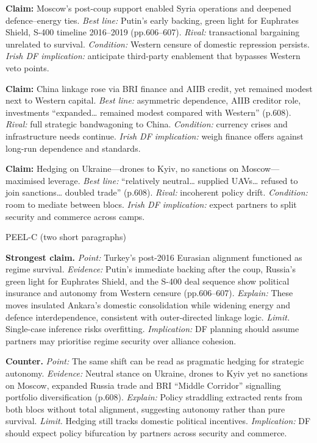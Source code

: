\textbf{Claim:} Moscow’s post-coup support enabled Syria operations and deepened defence–energy ties. \textit{Best line:} Putin’s early backing, green light for Euphrates Shield, S-400 timeline 2016–2019 (pp.606–607). \textit{Rival:} transactional bargaining unrelated to survival. \textit{Condition:} Western censure of domestic repression persists. \textit{Irish DF implication:} anticipate third-party enablement that bypasses Western veto points.

\textbf{Claim:} China linkage rose via BRI finance and AIIB credit, yet remained modest next to Western capital. \textit{Best line:} asymmetric dependence, AIIB creditor role, investments “expanded… remained modest compared with Western” (p.608). \textit{Rival:} full strategic bandwagoning to China. \textit{Condition:} currency crises and infrastructure needs continue. \textit{Irish DF implication:} weigh finance offers against long-run dependence and standards.

\textbf{Claim:} Hedging on Ukraine—drones to Kyiv, no sanctions on Moscow—maximised leverage. \textit{Best line:} “relatively neutral… supplied UAVs… refused to join sanctions… doubled trade” (p.608). \textit{Rival:} incoherent policy drift. \textit{Condition:} room to mediate between blocs. \textit{Irish DF implication:} expect partners to split security and commerce across camps.

PEEL-C (two short paragraphs)

\textbf{Strongest claim.} \textit{Point:} Turkey’s post-2016 Eurasian alignment functioned as regime survival. \textit{Evidence:} Putin’s immediate backing after the coup, Russia’s green light for Euphrates Shield, and the S-400 deal sequence show political insurance and autonomy from Western censure (pp.606–607). \textit{Explain:} These moves insulated Ankara’s domestic consolidation while widening energy and defence interdependence, consistent with outer-directed linkage logic. \textit{Limit.} Single-case inference risks overfitting. \textit{Implication:} DF planning should assume partners may prioritise regime security over alliance cohesion.

\textbf{Counter.} \textit{Point:} The same shift can be read as pragmatic hedging for strategic autonomy. \textit{Evidence:} Neutral stance on Ukraine, drones to Kyiv yet no sanctions on Moscow, expanded Russia trade and BRI “Middle Corridor” signalling portfolio diversification (p.608). \textit{Explain:} Policy straddling extracted rents from both blocs without total alignment, suggesting autonomy rather than pure survival. \textit{Limit.} Hedging still tracks domestic political incentives. \textit{Implication:} DF should expect policy bifurcation by partners across security and commerce.

